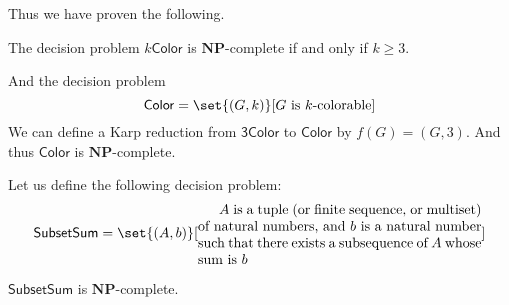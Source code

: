 \documentclass[10pt]{article}
\def\threecolor{\mathsf{3Color}}
\def\kcolor{k\mathsf{Color}}
\def\Color{\mathsf{Color}}
\def\subsum{\mathsf{SubsetSum}}
\def\NP{\mathbf{NP}}
\begin{document}
Thus we have proven the following.

\begin{prop*}

    The decision problem $\kcolor$ is $\NP$-complete if and only if $k\geq3$.

\end{prop*}

And the decision problem
\[ \Color = \set{(G,k)}[\text{$G$ is $k$-colorable}] \]
We can define a Karp reduction from $\threecolor$ to $\Color$ by $f(G)=(G,3)$.
And thus $\Color$ is $\NP$-complete.

Let us define the following decision problem:
\[ \subsum = \set{(A,b)}[\vcenter{\advance\hsize by-5cm\relax
$A$ is a tuple (or finite sequence, or multiset) of natural numbers, and $b$ is a natural number such that there exists a subsequence of $A$ whose sum is $b$}] \]

\begin{prop*}

    $\subsum$ is $\NP$-complete.

\end{prop*}
\end{document}
